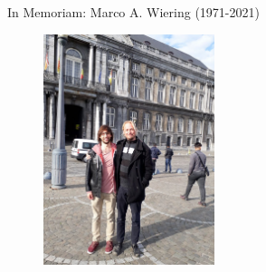 \documentclass{beamer}
\begin{document}
\begin{frame}{In Memoriam: Marco A. Wiering (1971-2021)}
	\begin{center}
		\begin{figure}
			\includegraphics[width=5cm]{./Images/marco}
		\end{figure}
	\end{center}


\end{frame}




\end{document}
